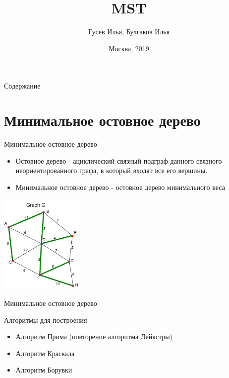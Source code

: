 \documentclass[10pt]{beamer}
\title[\href{https://goo.gl/NRgp8K}{https://goo.gl/NRgp8K} (Term 1)]{MST}
\author[Гусев Илья, Булгаков Илья]{Гусев Илья, Булгаков Илья}
\institute[МФТИ] 
{Московский физико-технический институт\\*}
\date{Москва, 2019}
\begin{document}
\begin{frame}
  \titlepage
\end{frame}

\begin{frame}{Содержание}
\tableofcontents
\end{frame}

\section{Минимальное остовное дерево}

\begin{frame}[fragile]{Минимальное остовное дерево}



\begin{itemize}
    \item Остовное дерево - ациклический связный подграф данного связного неориентированного графа, в который входят все его вершины.
    \item Минимальное остовное дерево - остовное дерево минимального веса
\end{itemize}

\begin{center}
    \includegraphics[width=4cm]{Term_2/Source/images/mst.png}
\end{center}

\end{frame}



\begin{frame}[fragile]{Минимальное остовное дерево}

Алгоритмы для построения
\begin{itemize}
    \item Алгоритм Прима (повторение алгоритма Дейкстры)
    \item Алгоритм Краскала
    \item Алгоритм Борувки
\end{itemize}

\end{frame}
\end{document}
